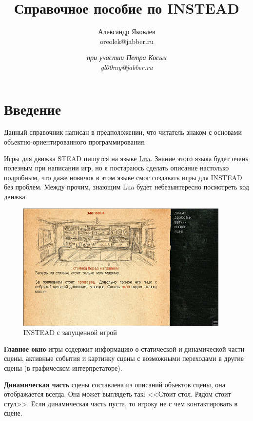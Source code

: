\documentclass[12pt]{article}
\begin{document}

\title{Справочное пособие по INSTEAD}
\author{Александр Яковлев\\oreolek@jabber.ru \and \textit{при участии Петра Косых}\\\textit{gl00my@jabber.ru}}
\maketitle
\tableofcontents
\clearpage
\section{Введение}
Данный справочник написан в предположении, что читатель знаком с основами объектно-ориентированного программирования.

Игры для движка STEAD пишутся на языке \href{http://www.lua.org}{Lua}. Знание этого языка будет очень полезным при написании игр, но я постараюсь сделать описание настолько подробным, что даже новичок в этом языке смог создавать игры для INSTEAD без проблем. Между прочим, знающим Lua будет небезынтересно посмотреть код движка.

\begin{figure}
\includegraphics[scale=0.7]{1.jpg}
\caption{INSTEAD с запущенной игрой}
\label{INSTEAD-running}
\end{figure}

\textbf{Главное окно} игры содержит информацию о статической и динамической части сцены, активные события и картинку сцены с возможными переходами в другие сцены (в графическом интерпретаторе).

\textbf{Динамическая часть} сцены составлена из описаний объектов сцены, она отображается всегда. Она может выглядеть так: <<Стоит стол. Рядом стоит стул>>. Если динамическая часть пуста, то игроку не с чем контактировать в сцене.
\end{document}

